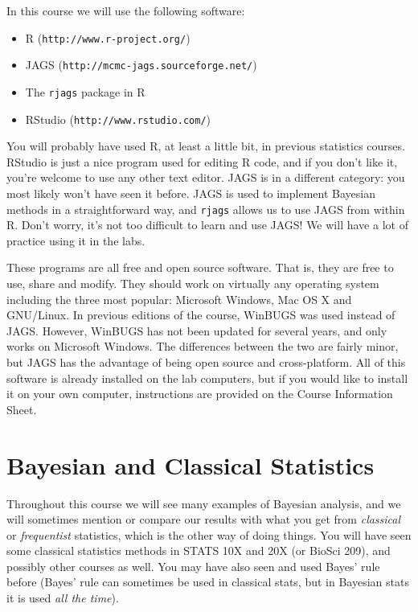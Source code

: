 In this course we will use the following software:
\begin{itemize}
\item R ({\tt http://www.r-project.org/})
\item JAGS ({\tt http://mcmc-jags.sourceforge.net/})
\item The {\tt rjags} package in R
\item RStudio ({\tt http://www.rstudio.com/})
\end{itemize}
You will probably have used R, at least a little bit, in previous statistics
courses. RStudio is just a nice program used for editing R code, and if you
don't like it, you're welcome to use any other text editor. JAGS is in a
different category: you most likely won't have seen it before. JAGS is used to
implement Bayesian methods in a straightforward way, and {\tt rjags} allows us
to use JAGS from within R.
Don't worry, it's not too difficult to learn and use JAGS! We will have a lot of
practice using it in the labs.

These programs are all free and open source software.
That is, they are free to use, share and modify. They should work on
virtually any operating system including the three most popular:
Microsoft Windows, Mac OS X and GNU/Linux. In previous editions of the course,
WinBUGS was used instead of JAGS. However, WinBUGS has not been updated for
several years, and only works on Microsoft Windows. The differences between
the two are fairly minor, but JAGS has the advantage of being open source and
cross-platform. All of this software is already installed on the lab computers,
but if you would like to install it on your own computer, instructions are
provided on the Course Information Sheet.

\section{Bayesian and Classical Statistics}
Throughout this course we will see many examples of Bayesian analysis, and we
will sometimes mention or compare our results with what you get from
{\it classical} or {\it frequentist} statistics, which is the other way of
doing things. You will have seen some classical statistics methods in STATS
10X and 20X (or BioSci 209), and possibly other courses as well.
You may have also seen and used Bayes' rule before (Bayes' rule can sometimes
be used in classical stats, but in Bayesian stats it is used
{\it all the time}).


